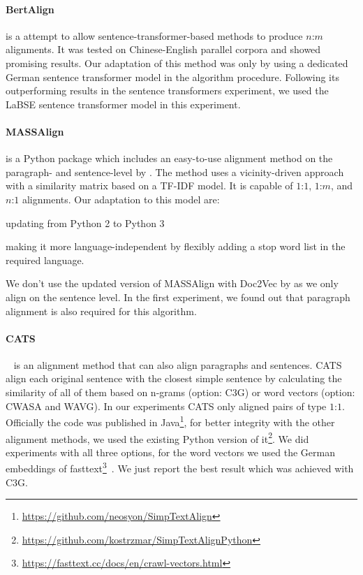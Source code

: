 \documentclass[11pt]{article}
\begin{document}
\paragraph{BertAlign} \cite{10.1093/llc/fqac089}
is a attempt to allow sentence-transformer-based methods to produce $n$:$m$ alignments. It was tested on Chinese-English parallel 
corpora and showed promising results.
Our adaptation of this method was only by using a dedicated German sentence transformer model in the algorithm procedure. Following its outperforming results in the sentence transformers experiment, we used the LaBSE sentence transformer model in this experiment.


\paragraph{MASSAlign}\cite{paetzold-etal-2017-massalign}
is a Python package which includes an easy-to-use alignment method on the paragraph- and sentence-level by \citet{DBLP:journals/corr/PaetzoldS16}.  The method uses a vicinity-driven approach with a similarity matrix based on a TF-IDF model. It is capable of $1$:$1$, $1$:$m$, and $n$:$1$ alignments. Our adaptation to this model are:
\begin{enumerate*}[label=\roman*)]
    \item updating from Python 2 to Python 3
    \item making it more language-independent by flexibly adding a stop word list in the required language.
\end{enumerate*} We don't use the updated version of MASSAlign with Doc2Vec by \citet{paun-2021-parallel} as we only align on the sentence level. In the first experiment, we found out that paragraph alignment is also required for this algorithm.

\paragraph{CATS}~\cite{stajner-etal-2018-cats}
is an alignment method that can also align paragraphs and sentences. CATS align each original sentence with the closest simple sentence by calculating the similarity of all of them based on n-grams (option: C3G) or word vectors (option: CWASA and WAVG). In our experiments CATS only aligned pairs of type $1$:$1$. Officially the code was published in Java\footnote{\url{https://github.com/neosyon/SimpTextAlign}}, for better integrity with the other alignment methods, we used the existing Python version of it\footnote{\url{https://github.com/kostrzmar/SimpTextAlignPython}}. We did experiments with all three options, for the word vectors we used the German embeddings of fasttext\footnote{\url{https://fasttext.cc/docs/en/crawl-vectors.html}}~\cite{athiwaratkun-etal-2018-probabilistic}. We just report the best result which was achieved with C3G.
\end{document}

